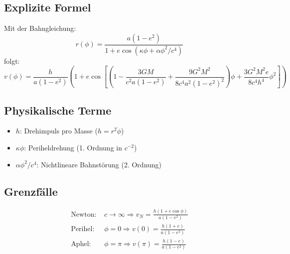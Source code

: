 \subsection{Explizite Formel}
Mit der Bahngleichung:
\begin{equation}
r(\phi) = \frac{a(1-e^2)}{1 + e\cos\left(\kappa\phi + \alpha\phi^2/c^4\right)}
\end{equation}
folgt:
\begin{equation}\boxed{
v(\phi) = \frac{h}{a(1-e^2)} \left(1 + e\cos\left[\left(1 - \frac{3GM}{c^2a(1-e^2)} + \frac{9G^2M^2}{8c^4a^2(1-e^2)^2}\right)\phi + \frac{3G^2M^2e}{8c^4h^4}\phi^2\right]\right)
}\end{equation}

\subsection*{Physikalische Terme}
\begin{itemize}[leftmargin=*,noitemsep]
    \item $h$: Drehimpuls pro Masse ($h = r^2\dot{\phi}$)
    \item $\kappa\phi$: Periheldrehung (1. Ordnung in $c^{-2}$)
    \item $\alpha\phi^2/c^4$: Nichtlineare Bahnstörung (2. Ordnung)
\end{itemize}

\subsection*{Grenzfälle}
\begin{align*}
    \text{Newton: } & c \to \infty \Rightarrow v_N = \frac{h(1+e\cos\phi)}{a(1-e^2)} \\
    \text{Perihel: } & \phi=0 \Rightarrow v(0) = \frac{h(1+e)}{a(1-e^2)} \\
    \text{Aphel: } & \phi=\pi \Rightarrow v(\pi) = \frac{h(1-e)}{a(1-e^2)}
\end{align*}
